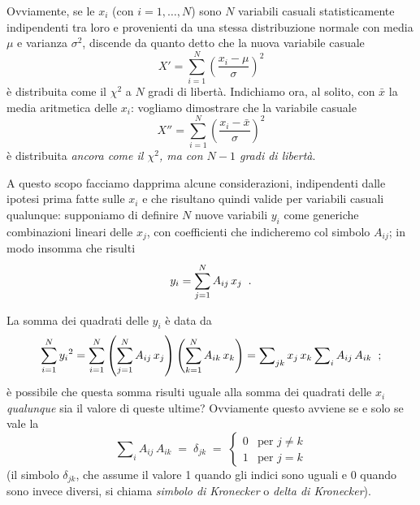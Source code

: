 Ovviamente, se le $x_i$ (con $i=1,\ldots,N$) sono $N$
variabili casuali statisticamente indipendenti tra loro e
provenienti da una stessa distribuzione normale con media
$\mu$ e varianza $\sigma^2$, discende da quanto detto che la
nuova variabile casuale
\begin{equation*}
  X' = \sum_{i=1}^N \left( \frac{x_i - \mu}{\sigma}
   \right)^2
\end{equation*}
\`e distribuita come il $\chi^2$ a $N$ gradi di libert\`a.
Indichiamo ora, al solito, con $\bar x$ la media aritmetica
delle $x_i$: vogliamo dimostrare che la variabile casuale
\begin{equation*}
  X'' = \sum_{i=1}^N \left( \frac{x_i - \bar x}{\sigma}
  \right)^2
\end{equation*}
\`e distribuita \emph{ancora come il $\chi^2$, ma con $N -
  1$ gradi di libert\`a}.

A questo scopo facciamo dapprima alcune considerazioni,
indipendenti dalle ipotesi prima fatte sulle $x_i$ e che
risultano quindi valide per variabili casuali qualunque:
supponiamo di definire $N$ nuove variabili $y_i$ come
generiche combinazioni lineari delle $x_j$, con coefficienti
che indicheremo col simbolo $A_{ij}$; in modo insomma che
risulti
\begin{equation*}
  y_i = \sum_{j=1}^N A_{ij} \, x_j \;\; .
\end{equation*}

La somma dei quadrati delle $y_i$ \`e data da
\begin{equation*}
  \sum_{i=1}^N {y_i}^2 = \sum_{i=1}^N \left(
  \sum_{j=1}^N A_{ij} \, x_j \right) \left( \sum_{k=1}^N
  A_{ik} \, x_k \right) = \sum\nolimits_{jk} x_j \, x_k
  \sum\nolimits_i A_{ij} \, A_{ik} \;\; ;
\end{equation*}
\`e possibile che questa somma risulti uguale alla somma dei
quadrati delle $x_i$ \emph{qualunque} sia il valore di
queste ultime?  Ovviamente questo avviene se e solo se vale
la
\begin{equation} \label{eq:12.conort}
  \sum\nolimits_i A_{ij} \, A_{ik} \; = \; \delta_{jk} \;
  = \;
  \begin{cases}
    0 & \text{per $j \ne k$} \\[2ex]
    1 & \text{per $j = k$}
  \end{cases}
\end{equation}
(il simbolo $\delta_{jk}$, che assume il valore 1 quando gli
indici sono uguali e 0 quando sono invece diversi, si chiama
\emph{simbolo di Kronecker} o \emph{delta di Kronecker}).%

